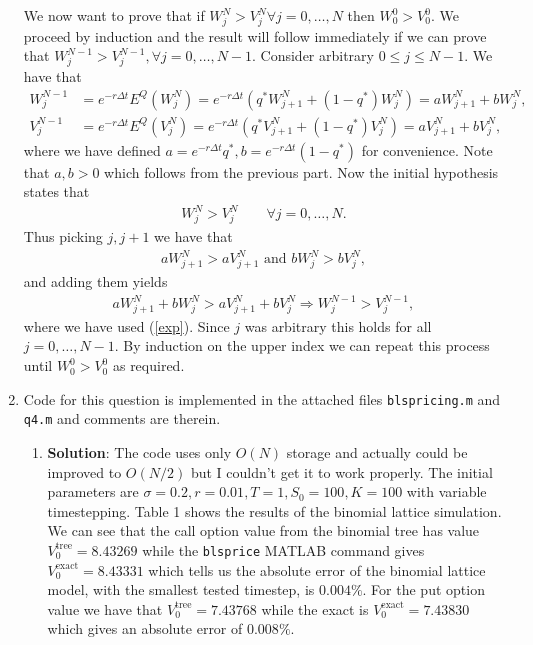 \documentclass[10pt,english]{article}
\theoremstyle{plain}
\newcommand{\dt}{\Delta t}
\begin{document}
\begin{enumerate}
We now want to prove that if $W^{N}_{j}>V^{N}_{j} \forall j=0,\ldots,N$ then $W^{0}_{0}>V^{0}_{0}$. We proceed by induction and the result will follow immediately if we can prove that $W^{N-1}_{j}>V^{N-1}_{j}, \forall j=0,\ldots, N-1$. Consider arbitrary $0\le j\le N-1$. We have that
\begin{align}
W^{N-1}_{j}&=e^{-r\dt}E^{Q}(W^{N}_{j}) = e^{-r\dt}(q^{*}W^{N}_{j+1}+(1-q^{*})W^{N}_{j})=aW^{N}_{j+1}+bW^{N}_{j},\nonumber\\
V^{N-1}_{j}&=e^{-r\dt}E^{Q}(V^{N}_{j}) = e^{-r\dt}(q^{*}V^{N}_{j+1}+(1-q^{*})V^{N}_{j})=aV^{N}_{j+1}+bV^{N}_{j},\label{exp}
\end{align}
where we have defined $a=e^{-r\dt}q^{*},b=e^{-r\dt}(1-q^{*})$ for convenience. Note that $a,b>0$ which follows from the previous part. Now the initial hypothesis states that
\begin{align*}
W^{N}_{j}>V^{N}_{j}\qquad \forall j=0,\ldots,N.
\end{align*}
Thus picking $j,j+1$ we have that
\begin{align*}
aW^{N}_{j+1}>aV^{N}_{j+1} \text{ and } bW^{N}_{j}>bV^{N}_{j},
\end{align*}
and adding them yields
\begin{align*}
aW^{N}_{j+1}+bW^{N}_{j} > aV^{N}_{j+1} + bV^{N}_{j}\Rightarrow W^{N-1}_{j} > V^{N-1}_{j},
\end{align*}
where we have used (\ref{exp}). Since $j$ was arbitrary this holds for all $j=0,\ldots,N-1$. By induction on the upper index we can repeat this process until $W^{0}_{0}>V^{0}_{0}$ as required.

\item Code for this question is implemented in the attached files \texttt{blspricing.m} and \texttt{q4.m} and comments are therein.
\begin{enumerate}
\item \textbf{Solution}: The code uses only $O(N)$ storage and actually could be improved to $O(N/2)$ but I couldn't get it to work properly. The initial parameters are $\sigma=0.2,r=0.01,T=1,S_{0}=100,K=100$ with variable timestepping. Table 1 shows the results of the binomial lattice simulation. We can see that the call option value from the binomial tree has value $V^{\text{tree}}_{0}=8.43269$ while the \texttt{blsprice} MATLAB command gives $V^{\text{exact}}_{0}=8.43331$ which tells us the absolute error of the binomial lattice model, with the smallest tested timestep, is $0.004\%$. For the put option value we have that $V^{\text{tree}}_{0}=7.43768$ while the exact is $V^{\text{exact}}_{0}=7.43830$ which gives an absolute error of $0.008\%$. 


\end{enumerate}
\end{enumerate}
\end{document}
